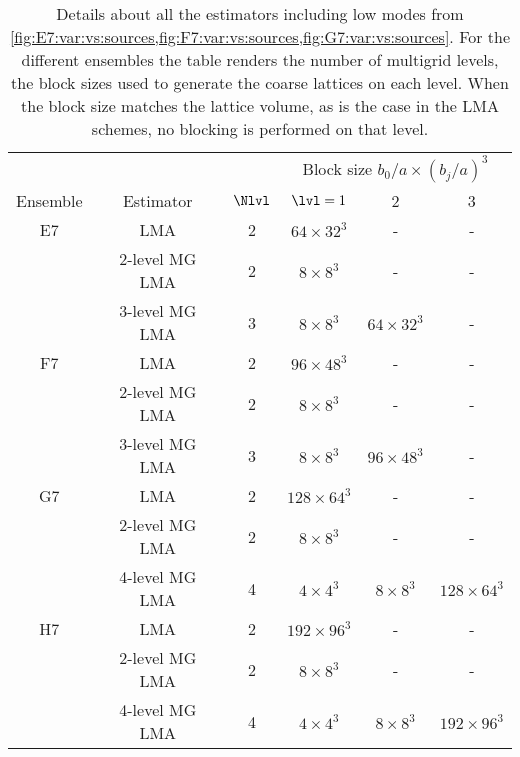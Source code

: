 \begin{table}
\centering
\begin{tabular}{cccccc}
\toprule
         &  &       & \multicolumn{3}{c}{Block size $b_0/a\times(b_j/a)^3$} \\
\cmidrule(lr){4-6}
Ensemble &  Estimator & $\Nlvl$ & $\lvl=1$      & 2 & 3 \\
\midrule
E7 & LMA            & 2 & $64\times32^3$  & -              & -               \\
   & 2-level MG LMA & 2 & $8\times8^3$    & -              & -               \\
   & 3-level MG LMA & 3 & $8\times8^3$    & $64\times32^3$ & -               \\
\midrule
F7 & LMA            & 2 & $96\times48^3$  & -              & -               \\
   & 2-level MG LMA & 2 & $8\times8^3$    & -              & -               \\
   & 3-level MG LMA & 3 & $8\times8^3$    & $96\times48^3$ & -               \\
\midrule
G7 & LMA            & 2 & $128\times64^3$ & -              & -               \\
   & 2-level MG LMA & 2 & $8\times8^3$    & -              & -               \\
   & 4-level MG LMA & 4 & $4\times4^3$    & $8\times8^3$   & $128\times64^3$ \\
\midrule
H7 & LMA            & 2 & $192\times96^3$ & -              & -               \\
   & 2-level MG LMA & 2 & $8\times8^3$    & -              & -               \\
   & 4-level MG LMA & 4 & $4\times4^3$    & $8\times8^3$   & $192\times96^3$ \\
\bottomrule
\end{tabular}
\caption{
Details about all the estimators including low modes from \cref{fig:E7:var:vs:sources,fig:F7:var:vs:sources,fig:G7:var:vs:sources}.
For the different ensembles the table renders the number of multigrid levels, the block sizes used to generate the coarse lattices on each level.
When the block size matches the lattice volume, as is the case in the LMA schemes, no blocking is performed on that level.
}
\label{tab:lma:estimators}
\end{table}

